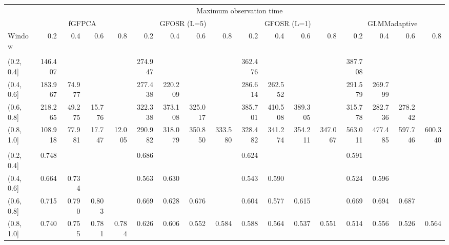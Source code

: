 \documentclass[
]{article}
\begin{document}
\begin{landscape}\begin{table}
\centering
\begin{tabular}{lrrrrrrrrrrrrrrrr}
\toprule
\multicolumn{1}{c}{ } & \multicolumn{16}{c}{Maximum observation time} \\
\cmidrule(l{3pt}r{3pt}){2-17}
\multicolumn{1}{c}{ } & \multicolumn{4}{c}{fGFPCA} & \multicolumn{4}{c}{GFOSR (L=5)} & \multicolumn{4}{c}{GFOSR (L=1)} & \multicolumn{4}{c}{GLMMadaptive} \\
\cmidrule(l{3pt}r{3pt}){2-5} \cmidrule(l{3pt}r{3pt}){6-9} \cmidrule(l{3pt}r{3pt}){10-13} \cmidrule(l{3pt}r{3pt}){14-17}
Window & 0.2 & 0.4 & 0.6 & 0.8 & 0.2 & 0.4 & 0.6 & 0.8 & 0.2 & 0.4 & 0.6 & 0.8 & 0.2 & 0.4 & 0.6 & 0.8\\
\midrule
\addlinespace[0.3em]
\multicolumn{17}{l}{\textbf{ISE}}\\
\hspace{1em}(0.2, 0.4] & 146.407 &  &  &  & 274.947 &  &  &  & 362.476 &  &  &  & 387.708 &  &  & \\
\hspace{1em}(0.4, 0.6] & 183.967 & 74.977 &  &  & 277.438 & 220.209 &  &  & 286.614 & 262.552 &  &  & 291.579 & 269.799 &  & \\
\hspace{1em}(0.6, 0.8] & 218.265 & 49.275 & 15.776 &  & 322.338 & 373.108 & 325.017 &  & 385.701 & 410.508 & 389.305 &  & 315.778 & 282.736 & 278.242 & \\
\hspace{1em}(0.8, 1.0] & 108.918 & 77.981 & 17.747 & 12.005 & 290.982 & 318.079 & 350.850 & 333.580 & 328.482 & 341.274 & 354.211 & 347.067 & 563.011 & 477.485 & 597.746 & 600.340\\
\addlinespace[0.3em]
\multicolumn{17}{l}{\textbf{AUC}}\\
\hspace{1em}(0.2, 0.4] & 0.748 &  &  &  & 0.686 &  &  &  & 0.624 &  &  &  & 0.591 &  &  & \\
\hspace{1em}(0.4, 0.6] & 0.664 & 0.734 &  &  & 0.563 & 0.630 &  &  & 0.543 & 0.590 &  &  & 0.524 & 0.596 &  & \\
\hspace{1em}(0.6, 0.8] & 0.715 & 0.790 & 0.803 &  & 0.669 & 0.628 & 0.676 &  & 0.604 & 0.577 & 0.615 &  & 0.669 & 0.694 & 0.687 & \\
\hspace{1em}(0.8, 1.0] & 0.740 & 0.755 & 0.781 & 0.784 & 0.626 & 0.606 & 0.552 & 0.584 & 0.588 & 0.564 & 0.537 & 0.551 & 0.514 & 0.556 & 0.526 & 0.564\\
\bottomrule
\end{tabular}
\end{table}
\end{landscape}
\end{document}
